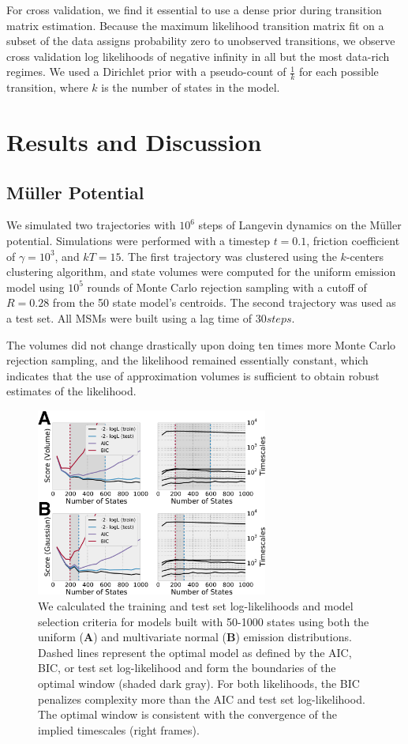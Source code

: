 \documentclass[journal=jpcbfk, layout=twocolumn, manuscript=article]{achemso}
\begin{document}
For cross validation, we find it essential to use a dense prior during transition matrix estimation. Because the maximum likelihood transition matrix fit on a subset of the data assigns probability zero to unobserved transitions, we observe cross validation log likelihoods of negative infinity in all but the most data-rich regimes. We used a Dirichlet prior with a pseudo-count of $\frac{1}{k}$ for each possible transition, where $k$ is the number of states in the model.

\section{Results and Discussion}
\subsection{M\"{u}ller Potential}
We simulated two trajectories with $10^6$ steps of Langevin dynamics on the M\"{u}ller potential\cite{Muller1980Reaction}. Simulations were performed with a timestep $t=0.1$, friction coefficient of $\gamma=10^3$, and $kT=15$. The first trajectory was clustered using the $k$-centers clustering algorithm, and state volumes were computed for the uniform emission model using $10^5$ rounds of Monte Carlo rejection sampling with a cutoff of $R=0.28$ from the 50 state model's centroids. The second trajectory was used as a test set. All MSMs were built using a lag time of $30 steps$.

The volumes did not change drastically upon doing ten times more Monte Carlo rejection sampling, and the likelihood remained essentially constant, which indicates that the use of approximation volumes is sufficient to obtain robust estimates of the likelihood. 

\begin{figure}[h]
\centering
\includegraphics[width=3in]{figs_final/mull_likes.png}
\caption{We calculated the training and test set log-likelihoods and model selection criteria for models built with 50-1000 states using both the uniform ({\bf A}) and multivariate normal ({\bf B}) emission distributions. Dashed lines represent the optimal model as defined by the AIC, BIC, or test set log-likelihood and form the boundaries of the optimal window (shaded dark gray). For both likelihoods, the BIC penalizes complexity more than the AIC and test set log-likelihood. The optimal window is consistent with the convergence of the implied timescales (right frames).}
\label{fig:mullerlike}
\end{figure}
\end{document}
